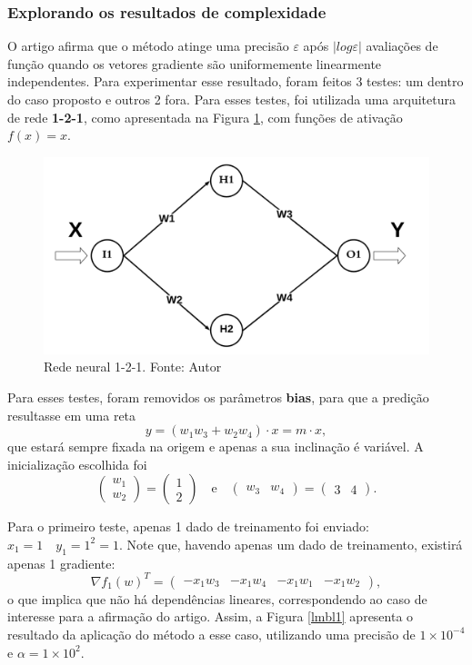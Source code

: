 \documentclass[11pt]{article}
\begin{document}
\subsubsection*{Explorando os resultados de complexidade}
O artigo \cite{bmLS} afirma que o método atinge uma precisão $\varepsilon$ após $|log \varepsilon|$ avaliações de função quando os vetores gradiente são uniformemente linearmente independentes. Para experimentar esse resultado, foram feitos 3 testes: um dentro do caso proposto e outros 2 fora. Para esses testes, foi utilizada uma arquitetura de rede \textbf{1-2-1}, como apresentada na Figura \ref{1-2-1}, com funções de ativação $f(x) = x$.
\begin{figure}[H]
\center
\includegraphics[scale=0.2]{Figuras/1-2-1.png}
\caption{Rede neural 1-2-1. Fonte: Autor} 
\label{1-2-1}
\end{figure}
Para esses testes, foram removidos os parâmetros \textbf{bias}, para que a predição resultasse em uma reta 
$$y = (w_1w_3 + w_2w_4)\cdot x = m\cdot x,$$
que estará sempre fixada na origem e apenas a sua inclinação é variável. A inicialização escolhida foi $$\begin{pmatrix}w_1 \\ w_2\end{pmatrix} = \begin{pmatrix}1 \\ 2\end{pmatrix} \quad \text{e} \quad \begin{pmatrix}w_3 & w_4\end{pmatrix} = \begin{pmatrix}3 & 4\end{pmatrix}.$$

Para o primeiro teste, apenas 1 dado de treinamento foi enviado: $x_1 = 1 \quad y_1 = 1^2 = 1$.
Note que, havendo apenas um dado de treinamento, existirá apenas 1 gradiente:
$$\nabla f_1(w)^T = \begin{pmatrix}-x_1 w_3 & -x_1 w_4 & -x_1 w_1 & -x_1 w_2  \end{pmatrix},$$
o que implica que não há dependências lineares, correspondendo ao caso de interesse para a afirmação do artigo.
Assim, a Figura \ref{lmbl1} apresenta o resultado da aplicação do método a esse caso, utilizando uma precisão de $1\times10^{-4}$ e $\alpha = 1\times10^{2}$.
\end{document}

